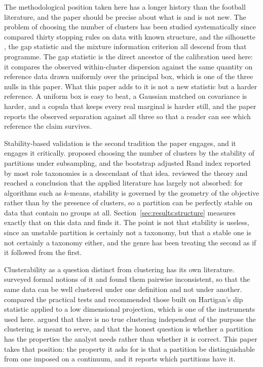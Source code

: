 The methodological position taken here has a longer history than the football
literature, and the paper should be precise about what is and is not new. The problem of
choosing the number of clusters has been studied systematically since
\citet{milligan1985examination} compared thirty stopping rules on data with known
structure, and the silhouette \citep{rousseeuw1987silhouettes}, the gap statistic
\citep{tibshirani2001estimating} and the mixture information criterion all descend from
that programme. The gap statistic is the direct ancestor of the calibration used here: it
compares the observed within-cluster dispersion against the same quantity on reference
data drawn uniformly over the principal box, which is one of the three nulls in this
paper. What this paper adds to it is not a new statistic but a harder reference. A
uniform box is easy to beat, a Gaussian matched on covariance is harder, and a copula that
keeps every real marginal is harder still, and the paper reports the observed separation
against all three so that a reader can see which reference the claim survives.

Stability-based validation is the second tradition the paper engages, and it engages it
critically. \citet{benhur2002stability} proposed choosing the number of clusters by the
stability of partitions under subsampling, and the bootstrap adjusted Rand index reported
by most role taxonomies is a descendant of that idea. \citet{vonluxburg2010stability}
reviewed the theory and reached a conclusion that the applied literature has largely not
absorbed: for algorithms such as $k$-means, stability is governed by the geometry of the
objective rather than by the presence of clusters, so a partition can be perfectly stable
on data that contain no groups at all. Section~\ref{sec:results:structure} measures
exactly that on this data and finds it. The point is not that stability is useless, since
an unstable partition is certainly not a taxonomy, but that a stable one is not certainly
a taxonomy either, and the genre has been treating the second as if it followed from the
first.

Clusterability as a question distinct from clustering has its own literature.
\citet{ackerman2009clusterability} surveyed formal notions of it and found them pairwise
inconsistent, so that the same data can be well clustered under one definition and not
under another. \citet{adolfsson2019cluster} compared the practical tests and recommended
those built on Hartigan's dip statistic \citep{hartigan1985dip} applied to a low
dimensional projection, which is one of the instruments used here. \citet{hennig2015true}
argued that there is no true clustering independent of the purpose the clustering is meant
to serve, and that the honest question is whether a partition has the properties the
analyst needs rather than whether it is correct. This paper takes that position: the
property it asks for is that a partition be distinguishable from one imposed on a
continuum, and it reports which partitions have it.

